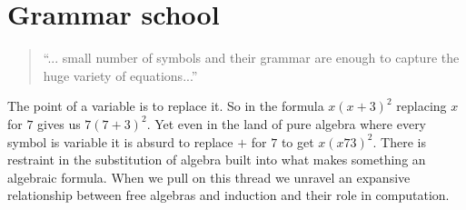 \chapter{Grammar school}\label{chp:grammar}

\begin{quote}
``... small number
of symbols and their grammar are enough to capture the huge
variety of equations...''
\end{quote}

The point of a variable is to replace it.  So in the formula 
$x(x+3)^2$ replacing $x$ for $7$ gives us $7(7+3)^2$.  
Yet even in the land of pure algebra where every symbol is variable it is absurd to
replace $+$ for $7$ to get $x(x73)^2$.   There is restraint in the substitution
of algebra built into what makes something an algebraic formula. When we pull 
on this thread we unravel an expansive relationship between free algebras and induction
and their role in computation.


